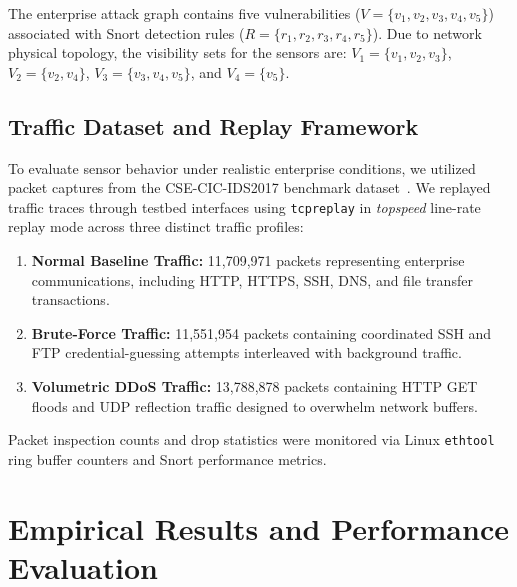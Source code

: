\documentclass[conference]{IEEEtran}
\begin{document}
The enterprise attack graph contains five vulnerabilities ($V = \{v_1, v_2, v_3, v_4, v_5\}$) associated with Snort detection rules ($R = \{r_1, r_2, r_3, r_4, r_5\}$). Due to network physical topology, the visibility sets for the sensors are:
$V_1 = \{v_1, v_2, v_3\}$, $V_2 = \{v_2, v_4\}$, $V_3 = \{v_3, v_4, v_5\}$, and $V_4 = \{v_5\}$.

\subsection{Traffic Dataset and Replay Framework}
To evaluate sensor behavior under realistic enterprise conditions, we utilized packet captures from the CSE-CIC-IDS2017 benchmark dataset~\cite{sharafaldin2018toward}. We replayed traffic traces through testbed interfaces using \texttt{tcpreplay} in \textit{topspeed} line-rate replay mode across three distinct traffic profiles:
\begin{enumerate}
    \item \textbf{Normal Baseline Traffic:} 11,709,971 packets representing enterprise communications, including HTTP, HTTPS, SSH, DNS, and file transfer transactions.
    \item \textbf{Brute-Force Traffic:} 11,551,954 packets containing coordinated SSH and FTP credential-guessing attempts interleaved with background traffic.
    \item \textbf{Volumetric DDoS Traffic:} 13,788,878 packets containing HTTP GET floods and UDP reflection traffic designed to overwhelm network buffers.
\end{enumerate}

Packet inspection counts and drop statistics were monitored via Linux \texttt{ethtool} ring buffer counters and Snort performance metrics.

\section{Empirical Results and Performance Evaluation}
\label{sec:results}
\end{document}
